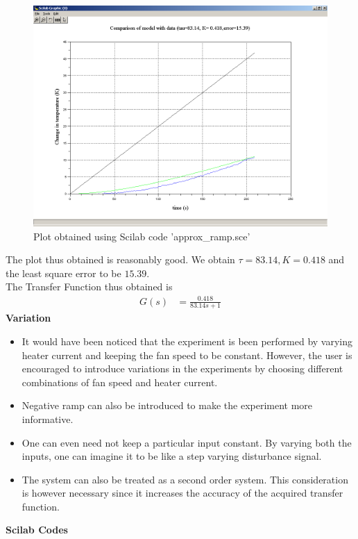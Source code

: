 \documentclass[12pt]{article}
\begin{document}
\begin{figure}[h]
\centering
\includegraphics[width=\linewidth]{approx_ramp}
\caption{Plot obtained using Scilab code 'approx\_ramp.sce'}
\end{figure}
The plot thus obtained is  reasonably good. We obtain $\tau = 83.14, K = 0.418$ and the least square error to be $ 15.39$.\\
The Transfer Function thus obtained is
\begin{align}
G(s)&=\frac{0.418}{83.14s+1}
\end{align}
\newpage
\textbf{Variation}\\
\begin{itemize}
\item It would have been noticed that the experiment is been performed by varying heater current and keeping the fan speed to be constant. However, the user is encouraged to introduce variations in the experiments by choosing different combinations of fan speed and heater current. 
\item Negative ramp can also be introduced to make the experiment more informative. 
\item One can even need not keep a particular input constant. By varying both the inputs, one can imagine it to be like a step varying disturbance signal.
\item The system can also be treated as a second order system. This consideration is however necessary since it increases the accuracy of the acquired transfer function.\cite{kmm09}
\end{itemize}
\newpage
\textbf{Scilab Codes}
\end{document}
